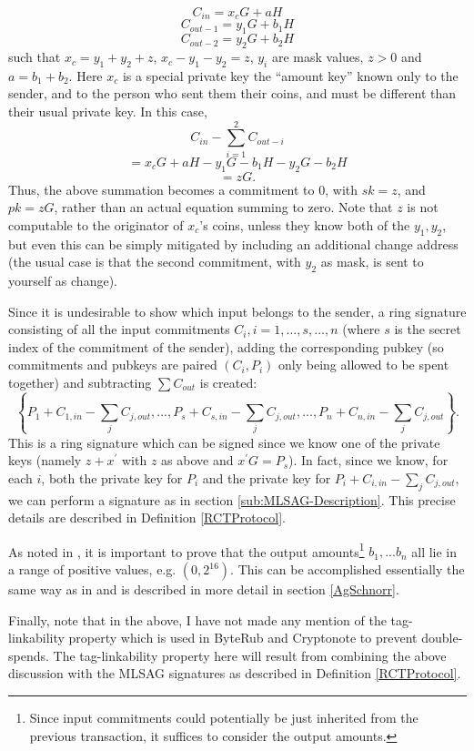 \documentclass[12pt,english]{mrl}
\theoremstyle{definition}
\numberwithin{equation}{section}
\numberwithin{figure}{section}
\numberwithin{equation}{section}
\numberwithin{equation}{section}
\numberwithin{figure}{section}
\begin{document}
\[
C_{in}=x_{c}G+aH
\]
\[
C_{out-1}=y_{1}G+b_{1}H
\]
\[
C_{out-2}=y_{2}G+b_{2}H
\]
 such that $x_{c}=y_{1}+y_{2}+z$, $x_{c}-y_{1}-y_{2}=z$, $y_{i}$
are mask values, $z>0$ and $a=b_{1}+b_{2}.$ Here $x_{c}$ is a special
private key the ``amount key'' known only to the sender, and to
the person who sent them their coins, and must be different than their
usual private key. In this case, 
\[
C_{in}-\sum_{i=1}^{2}C_{out-i}
\]
\[
=x_{c}G+aH-y_{1}G-b_{1}H-y_{2}G-b_{2}H
\]
\[
=zG.
\]
Thus, the above summation becomes a commitment to $0$, with $sk=z$,
and $pk=zG$, rather than an actual equation summing to zero. Note
that $z$ is not computable to the originator of $x_{c}$'s coins,
unless they know both of the $y_{1},y_{2}$, but even this can be simply mitigated by including an additional change address (the usual case is that the second commitment, with $y_2$ as mask, is sent to yourself as change).  

Since it is undesirable to show which input belongs to the sender,
a ring signature consisting of all the input commitments $C_{i},i=1,...,s,...,n$
(where $s$ is the secret index of the commitment of the sender),
adding the corresponding pubkey (so commitments and pubkeys are paired
$\left(C_{i},P_{i}\right)$ only being allowed to be spent together)
and subtracting $\sum C_{out}$ is created: 
\[
\left\{ P_{1}+C_{1,in}-\sum_{j}C_{j,out},...,P_{s}+C_{s,in}-\sum_{j}C_{j,out},...,P_{n}+C_{n,in}-\sum_{j}C_{j,out}\right\} .
\]
 This is a ring signature which can be signed since we know one of
the private keys (namely $z+x^{\prime}$ with $z$ 
as above and $x^{\prime}G=P_{s}$). In fact, since we know, for each $i$, both the private key for $P_{i}$ and the private key for $P_{i}+C_{i,in}-\sum_{j}C_{j,out}$,
we can perform a signature as in section \ref{sub:MLSAG-Description}. This precise details are described in Definition \ref{RCTProtocol}.

As noted in \cite{GM}, it is important to prove that the output amounts\footnote{Since input commitments could potentially be just inherited from the
previous transaction, it suffices to consider the output amounts.}
$b_{1},...b_{n}$ all lie in a range of positive values, e.g. $(0,2^{16}).$
This can be accomplished essentially the same way as in \cite{GM} and is described in more detail in section \ref{AgSchnorr}.

Finally, note that in the above, I have not made any mention of the tag-linkability property which is used in ByteRub and Cryptonote to prevent double-spends. The tag-linkability property here will result from combining the above discussion with the MLSAG signatures as described in Definition \ref{RCTProtocol}.
\end{document}
